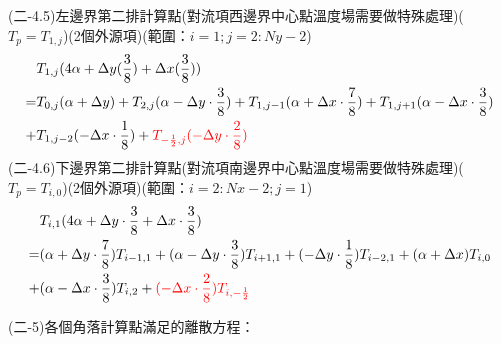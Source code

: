 \documentclass[12pt]{article}
\begin{document}
\noindent (二-4.5)左邊界第二排計算點(對流項西邊界中心點溫度場需要做特殊處理)($T_{p} = T_{1,j}$)(2個外源項)(範圍：$i = 1 ; j = 2 : Ny-2$)\\
\begin{equation}
\begin{split}
  & T_{1,j}(4\alpha  + \Delta y(\frac{3}{8}) + \Delta x(\frac{3}{8}))\\
  = & T_{0,j}(\alpha+\Delta y)+T_{2,j}(\alpha- \Delta y \cdot \frac{3}{8})+T_{1,j-1}(\alpha+ \Delta x  \cdot \frac{7}{8})+T_{1,j+1}(\alpha - \Delta x  \cdot \frac{3}{8})\\
  + & T_{1,j-2}(- \Delta x  \cdot \frac{1}{8})+{\color {red}{T_{-\frac{1}{2},j}(-\Delta y  \cdot \frac{2}{8})}}
\end{split}
\end{equation}
\newpage
\noindent (二-4.6)下邊界第二排計算點(對流項南邊界中心點溫度場需要做特殊處理)($T_{p} = T_{i,0}$)(2個外源項)(範圍：$i = 2 : Nx-2 ; j = 1$)\\
\begin{equation}
\begin{split}
  & T_{i,1}(4\alpha+\Delta y \cdot \frac{3}{8}+\Delta x \cdot \frac{3}{8})\\
  = &(\alpha+\Delta y \cdot \frac{7}{8})T_{i-1,1}+(\alpha-\Delta y \cdot \frac{3}{8})T_{i+1,1}+(-\Delta y \cdot \frac{1}{8})T_{i-2,1}+(\alpha+\Delta x )T_{i,0}\\
  + &(\alpha-\Delta x \cdot \frac{3}{8})T_{i,2}+{\color {red}{(-\Delta x \cdot \frac{2}{8})T_{i,-\frac{1}{2}}}}\\
\end{split}
\end{equation}

\noindent (二-5)各個角落計算點滿足的離散方程：\\
\end{document}
